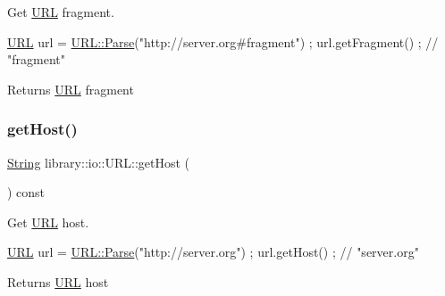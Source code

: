 Get \hyperlink{classlibrary_1_1io_1_1_u_r_l}{U\+RL} fragment. 


\begin{DoxyCode}
\hyperlink{classlibrary_1_1io_1_1_u_r_l_a7e9c070138a6dbd000ffb10b7cd8a5c4}{URL} url = \hyperlink{classlibrary_1_1io_1_1_u_r_l_a98cf42141cf75e1dd5362eb208a1e2bd}{URL::Parse}(\textcolor{stringliteral}{"http://server.org#fragment"}) ;
url.getFragment() ; \textcolor{comment}{// "fragment"}
\end{DoxyCode}


\begin{DoxyReturn}{Returns}
\hyperlink{classlibrary_1_1io_1_1_u_r_l}{U\+RL} fragment 
\end{DoxyReturn}
\mbox{\label{classlibrary_1_1io_1_1_u_r_l_a044ced19c2b73656c52d79a434cea560}} 
\subsubsection{\texorpdfstring{get\+Host()}{getHost()}}
{\footnotesize\ttfamily \hyperlink{namespacelibrary_1_1io_a7469b45835a4421045db344d6a5a1f85}{String} library\+::io\+::\+U\+R\+L\+::get\+Host (\begin{DoxyParamCaption}{ }\end{DoxyParamCaption}) const}



Get \hyperlink{classlibrary_1_1io_1_1_u_r_l}{U\+RL} host. 


\begin{DoxyCode}
\hyperlink{classlibrary_1_1io_1_1_u_r_l_a7e9c070138a6dbd000ffb10b7cd8a5c4}{URL} url = \hyperlink{classlibrary_1_1io_1_1_u_r_l_a98cf42141cf75e1dd5362eb208a1e2bd}{URL::Parse}(\textcolor{stringliteral}{"http://server.org"}) ;
url.getHost() ; \textcolor{comment}{// "server.org"}
\end{DoxyCode}


\begin{DoxyReturn}{Returns}
\hyperlink{classlibrary_1_1io_1_1_u_r_l}{U\+RL} host 
\end{DoxyReturn}
\mbox{\label{classlibrary_1_1io_1_1_u_r_l_a5d8c1d85b26f35d95153a2ed1f45e578}} 
